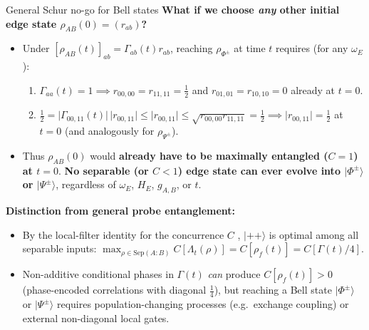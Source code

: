 \documentclass[aspectratio=169,11pt]{beamer}
\newcommand{\ket}[1]{\lvert #1\rangle}
\begin{document}
\begin{frame}{General Schur no-go for Bell states}
\small
\textbf{What if we choose \emph{any} other initial edge state $\rho_{AB}(0)=(r_{ab})$?}
\begin{itemize}\setlength\itemsep{4pt}
\item Under $[\rho_{AB}(t)]_{ab}=\Gamma_{ab}(t)r_{ab}$, reaching $\rho_{\Phi^\pm}$ at time $t$ requires (for any $\omega_E$):
\begin{enumerate}\footnotesize\setlength\itemsep{1pt}
\item $\Gamma_{aa}(t)=1 \implies r_{00,00}=r_{11,11}=\tfrac12$ and $r_{01,01}=r_{10,10}=0$ already at $t=0$.
\item $\tfrac12=\lvert\Gamma_{00,11}(t)\rvert\,\lvert r_{00,11}\rvert\le\lvert r_{00,11}\rvert\le\sqrt{r_{00,00}r_{11,11}}=\tfrac12 \implies \lvert r_{00,11}\rvert=\tfrac12$ at $t=0$ (and analogously for $\rho_{\Psi^\pm}$).
\end{enumerate}
\item Thus $\rho_{AB}(0)$ would \textbf{already have to be maximally entangled ($C=1$) at $t=0$}. \textbf{No separable (or $C<1$) edge state can ever evolve into $\ket{\Phi^\pm}$ or $\ket{\Psi^\pm}$}, regardless of $\omega_E$, $H_E$, $g_{A,B}$, or $t$.
\end{itemize}
\smallskip
\textbf{Distinction from general probe entanglement:}
\begin{itemize}\setlength\itemsep{4pt}
\item By the local-filter identity for the concurrence $C$ \cite{Wootters1998}, $\ket{++}$ is optimal among all separable inputs:
$\max_{\rho\in\mathrm{Sep}(A:B)}C[\Lambda_t(\rho)]=C[\rho_f(t)]=C[\Gamma(t)/4]$.
\item Non-additive conditional phases in $\Gamma(t)$ \emph{can} produce $C[\rho_f(t)]>0$ (phase-encoded correlations with diagonal $\tfrac14$), but reaching a Bell state $\ket{\Phi^\pm}$ or $\ket{\Psi^\pm}$ requires population-changing processes (e.g.\ exchange coupling) or external non-diagonal local gates.
\end{itemize}
\end{frame}
\end{document}
